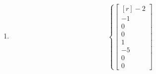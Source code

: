 \documentclass[12pt]{article}
\begin{document}
\begin{enumerate}
\[+\lambda_{1}\begin{bmatrix*}[r]1\\1\\0\\0\\0\\0\\0\\0\end{bmatrix*}
+\lambda_{2}\begin{bmatrix*}[r]4\\0\\1\\0\\0\\0\\0\\0\end{bmatrix*}
+\lambda_{3}\begin{bmatrix*}[r]-1\\0\\0\\1\\0\\0\\0\\0\end{bmatrix*}
+\lambda_{4}\begin{bmatrix*}[r]5\\0\\0\\0\\-4\\1\\0\\0\end{bmatrix*}
+\lambda_{5}\begin{bmatrix*}[r]-4\\0\\0\\0\\1\\0\\1\\0\end{bmatrix*}
\;:\;\lambda_{1},\lambda_{2},\lambda_{3},\lambda_{4},\lambda_{5}\in\mathbb{R}\right\}
\]
\item\[\left\{\begin{bmatrix*}[r]-2\\-1\\0\\0\\1\\-5\\0\\0\end{bmatrix*}
\]
\end{enumerate}
\end{document}
